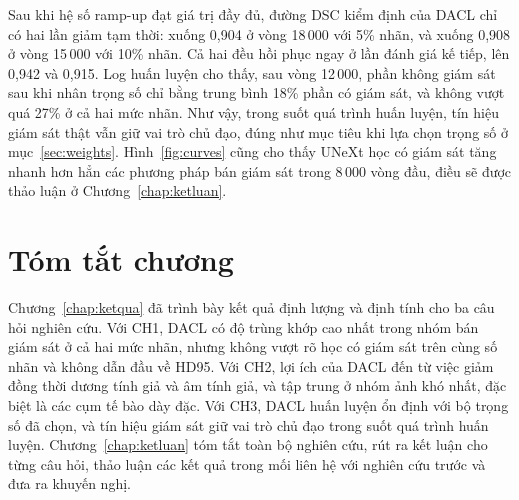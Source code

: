 Sau khi hệ số ramp-up đạt giá trị đầy đủ, đường DSC kiểm định của DACL chỉ có hai lần giảm tạm thời: xuống 0,904 ở vòng 18\,000 với 5\% nhãn, và xuống 0,908 ở vòng 15\,000 với 10\% nhãn. Cả hai đều hồi phục ngay ở lần đánh giá kế tiếp, lên 0,942 và 0,915. Log huấn luyện cho thấy, sau vòng 12\,000, phần không giám sát sau khi nhân trọng số chỉ bằng trung bình 18\% phần có giám sát, và không vượt quá 27\% ở cả hai mức nhãn. Như vậy, trong suốt quá trình huấn luyện, tín hiệu giám sát thật vẫn giữ vai trò chủ đạo, đúng như mục tiêu khi lựa chọn trọng số ở mục~\ref{sec:weights}. Hình~\ref{fig:curves} cũng cho thấy UNeXt học có giám sát tăng nhanh hơn hẳn các phương pháp bán giám sát trong 8\,000 vòng đầu, điều sẽ được thảo luận ở Chương~\ref{chap:ketluan}.

\section{Tóm tắt chương}

Chương~\ref{chap:ketqua} đã trình bày kết quả định lượng và định tính cho ba câu hỏi nghiên cứu. Với CH1, DACL có độ trùng khớp cao nhất trong nhóm bán giám sát ở cả hai mức nhãn, nhưng không vượt rõ học có giám sát trên cùng số nhãn và không dẫn đầu về HD95. Với CH2, lợi ích của DACL đến từ việc giảm đồng thời dương tính giả và âm tính giả, và tập trung ở nhóm ảnh khó nhất, đặc biệt là các cụm tế bào dày đặc. Với CH3, DACL huấn luyện ổn định với bộ trọng số đã chọn, và tín hiệu giám sát giữ vai trò chủ đạo trong suốt quá trình huấn luyện. Chương~\ref{chap:ketluan} tóm tắt toàn bộ nghiên cứu, rút ra kết luận cho từng câu hỏi, thảo luận các kết quả trong mối liên hệ với nghiên cứu trước và đưa ra khuyến nghị.
